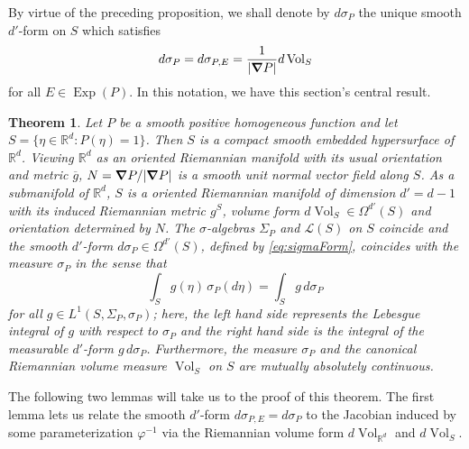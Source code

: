\documentclass[11pt, letter]{book}
\newtheorem{theorem}{Theorem}[section]
\newcommand\Exp{\operatorname{Exp}}
\newcommand{\Vol}{\operatorname{Vol}}
\begin{document}
\noindent By virtue of the preceding proposition, we shall denote by $d\sigma_P$ the unique smooth $d'$-form on $S$ which satisfies
\begin{equation}\label{eq:sigmaForm}
    d\sigma_P=d\sigma_{P,E}=\frac{1}{|\grad P|}d\Vol_S
\end{equation}
for all $E\in\Exp(P)$. In this notation, we have this section's central result.



\begin{framed}
\begin{theorem}\label{thm:RiemannLebesgue}
Let $P$ be a smooth positive homogeneous function and let $S=\{\eta\in\mathbb{R}^d:P(\eta)=1\}$. Then $S$ is a compact smooth embedded hypersurface of $\mathbb{R}^d$. Viewing $\mathbb{R}^d$ as an oriented Riemannian manifold with its usual orientation and metric $\overline{g}$, $N=\grad P/|\grad P|$ is a smooth unit normal vector field along $S$. As a submanifold of $\mathbb{R}^d$, $S$ is a oriented Riemannian manifold of dimension $d'=d-1$ with its induced Riemannian metric $g^S$, volume form $d\Vol_S\in\Omega^{d'}(S)$ and orientation determined by $N$. The $\sigma$-algebras $\Sigma_P$ and $\mathcal{L}(S)$ on $S$ coincide and the smooth $d'$-form $d\sigma_P\in\Omega^{d'}(S)$, defined by \eqref{eq:sigmaForm}, coincides with the measure $\sigma_P$ in the sense that
\begin{equation}\label{eq:FormsAndMeasures}
\int_S g(\eta)\,\sigma_P(d\eta)=\int_S g\,d\sigma_P
\end{equation}
for all $g\in L^1(S,\Sigma_P,\sigma_P)$; here, the left hand side represents the Lebesgue integral of $g$ with respect to $\sigma_P$ and the right hand side is the integral of the measurable $d'$-form $g\, d\sigma_P$. Furthermore, the measure $\sigma_P$ and the canonical Riemannian volume measure $\Vol_S$ on $S$ are mutually absolutely continuous.
\end{theorem} 
\end{framed}

\noindent The following two lemmas will take us to the proof of this theorem. The first lemma lets us relate the smooth $d'$-form $d\sigma_{P,E} = d\sigma_P$ to the Jacobian induced by some parameterization $\varphi^{-1}$ via the Riemannian volume form $d\Vol_{\mathbb{R}^d}$ and $d\Vol_S$.
\end{document}
